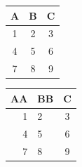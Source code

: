 \documentclass{article}
\begin{document}
\begin{multicols}{2} %

    \centering
    \label{tab:tab1}
    \begin{tabular}{|c|c|c|}                            %
        \hline                                          %
        A & B & C \\
        \hline
        1 & 2 & 3 \\
        \hline
        4 & 5 & 6 \\
        \hline
        7 & 8 & 9 \\
        \hline
    \end{tabular}
    
    \columnbreak %
    
    \centering
    \label{tab:tab2}
    \begin{tabular}{r||l c|}
        \hline
        AA & BB & C \\
        \hline
        1 & 2 & 3 \\
        4 & 5 & 6 \\
        \hline
        \hline
        7 & 8 & 9 \\
    \end{tabular}
    
\end{multicols}
\end{document}
